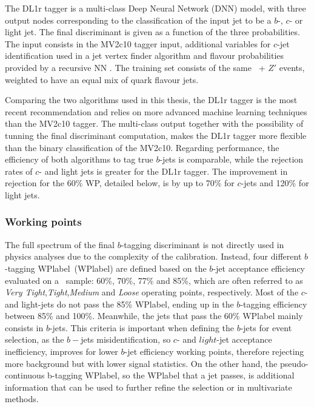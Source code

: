 The DL1r tagger is a multi-class Deep Neural Network (DNN) model, with three output nodes corresponding to the classification of the input jet to be a $b$-, $c$- or light jet. The final discriminant is given as a function of the three probabilities. The input consists in the MV2c10 tagger input, additional variables for $c$-jet identification used in a jet vertex finder algorithm and flavour probabilities provided by a recursive NN . The training set consists of the same \ttbar\ + $Z'$ events, weighted to have an equal mix of quark flavour jets.

Comparing the two algorithms used in this thesis, the DL1r tagger is the most recent recommendation and relies on more advanced machine learning techniques than the MV2c10 tagger. The multi-class output together with the possibility of tunning the final discriminant computation, makes the DL1r tagger more flexible than the binary classification of the MV2c10. Regarding performance, the efficiency of both algorithms to tag true $b$-jets is comparable, while the rejection rates of $c$- and light jets is greater for the DL1r tagger. The improvement in rejection for the 60\% WP, detailed below, is by up to 70\% for $c$-jets and 120\% for light jets.


\subsubsection{Working points}

The full spectrum of the final $b$-tagging discriminant is not directly used in physics analyses due to the complexity of the calibration. Instead, four different $b$-tagging \acrlong{WPlabel}~(\acrshort{WPlabel}) are defined based on the $b$-jet acceptance efficiency evaluated on a \ttbar\ sample: 60\%, 70\%, 77\% and 85\%, which are often referred to as \textit{Very Tight},\textit{Tight},\textit{Medium} and \textit{Loose} operating points, respectively. Most of the $c$- and light-jets do not pass the 85\% \acrshort{WPlabel}, ending up in the $b$-tagging efficiency between 85\% and 100\%. Meanwhile, the jets that pass the 60\% \acrshort{WPlabel} mainly consists in $b$-jets. This criteria is important when defining the $b$-jets for event selection, as the $b-$jets misidentification, so $c$- and $light$-jet acceptance inefficiency, improves for lower $b$-jet efficiency working points, therefore rejecting more background but with lower signal statistics. On the other hand, the pseudo-continuous b-tagging \acrshort{WPlabel}, so the \acrshort{WPlabel} that a jet passes, is additional information that can be used to further refine the selection or in multivariate methods.

